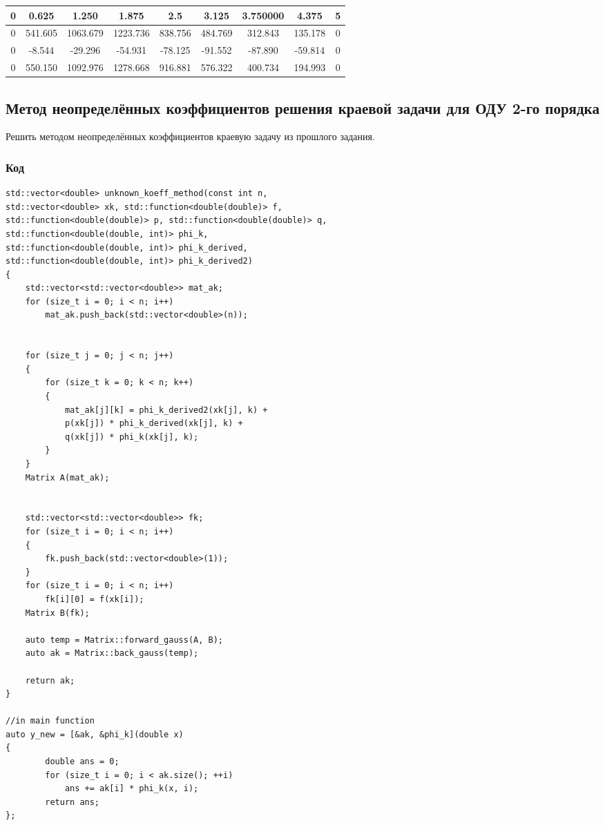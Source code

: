 \documentclass[bachelor, och, pract]{SCWorks}
\begin{document}
\begin{table}[H]
    \centering
    \begin{tabular}{|c|c|c|c|c|c|c|c|c|}
\hline 0  &   0.625  & 1.250 &   1.875 & 2.5 &      3.125  &   3.750000  &  4.375  &  5 \\\hline
 0   & 541.605  & 1063.679& 1223.736&   838.756  &        484.769  &   312.843 &135.178 &    0\\\hline
0 & -8.544  &  -29.296 &-54.931 &  -78.125&    -91.552  & -87.890  &  -59.814  & 0 \\\hline
0     &     550.150 &1092.976  & 1278.668 & 916.881  &  576.322  &400.734 &  194.993 &0\\\hline
    \end{tabular}
\end{table}


\subsection{Метод неопределённых коэффициентов решения краевой задачи
для ОДУ 2-го порядка}

Решить методом неопределённых коэффициентов краевую задачу из прошлого задания.


\subsubsection{Код}

\begin{lstlisting}
std::vector<double> unknown_koeff_method(const int n, 
std::vector<double> xk, std::function<double(double)> f, 
std::function<double(double)> p, std::function<double(double)> q, 
std::function<double(double, int)> phi_k,
std::function<double(double, int)> phi_k_derived, 
std::function<double(double, int)> phi_k_derived2)
{
    std::vector<std::vector<double>> mat_ak;
    for (size_t i = 0; i < n; i++)
        mat_ak.push_back(std::vector<double>(n));


    for (size_t j = 0; j < n; j++)
    {
        for (size_t k = 0; k < n; k++)
        {
            mat_ak[j][k] = phi_k_derived2(xk[j], k) + 
            p(xk[j]) * phi_k_derived(xk[j], k) +
            q(xk[j]) * phi_k(xk[j], k);
        }
    }
    Matrix A(mat_ak);


    std::vector<std::vector<double>> fk;
    for (size_t i = 0; i < n; i++)
    {
        fk.push_back(std::vector<double>(1));
    }
    for (size_t i = 0; i < n; i++)
        fk[i][0] = f(xk[i]);
    Matrix B(fk);

    auto temp = Matrix::forward_gauss(A, B);
    auto ak = Matrix::back_gauss(temp);
  
    return ak;
}

//in main function
auto y_new = [&ak, &phi_k](double x)
{
        double ans = 0;
        for (size_t i = 0; i < ak.size(); ++i)
            ans += ak[i] * phi_k(x, i);
        return ans;
};
\end{lstlisting}
\end{document}
